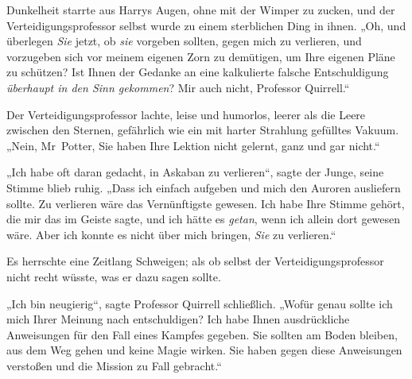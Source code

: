 Dunkelheit starrte aus Harrys Augen, ohne mit der Wimper zu zucken, und der Verteidigungsprofessor selbst wurde zu einem sterblichen Ding in ihnen. „Oh, und überlegen \emph{Sie} jetzt, ob \emph{sie} vorgeben sollten, gegen mich zu verlieren, und vorzugeben sich vor meinem eigenen Zorn zu demütigen, um Ihre eigenen Pläne zu schützen? Ist Ihnen der Gedanke an eine kalkulierte falsche Entschuldigung \emph{überhaupt in den Sinn gekommen}? Mir auch nicht, Professor Quirrell.“

Der Verteidigungsprofessor lachte, leise und humorlos, leerer als die Leere zwischen den Sternen, gefährlich wie ein mit harter Strahlung gefülltes Vakuum. „Nein, Mr~Potter, Sie haben Ihre Lektion nicht gelernt, ganz und gar nicht.“

„Ich habe oft daran gedacht, in Askaban zu verlieren“, sagte der Junge, seine Stimme blieb ruhig. „Dass ich einfach aufgeben und mich den Auroren ausliefern sollte. Zu verlieren wäre das Vernünftigste gewesen. Ich habe Ihre Stimme gehört, die mir das im Geiste sagte, und ich hätte es \emph{getan}, wenn ich allein dort gewesen wäre. Aber ich konnte es nicht über mich bringen, \emph{Sie} zu verlieren.“

Es herrschte eine Zeitlang Schweigen; als ob selbst der Verteidigungsprofessor nicht recht wüsste, was er dazu sagen sollte.

„Ich bin neugierig“, sagte Professor Quirrell schließlich. „Wofür genau sollte ich mich Ihrer Meinung nach entschuldigen? Ich habe Ihnen ausdrückliche Anweisungen für den Fall eines Kampfes gegeben. Sie sollten am Boden bleiben, aus dem Weg gehen und keine Magie wirken. Sie haben gegen diese Anweisungen verstoßen und die Mission zu Fall gebracht.“

